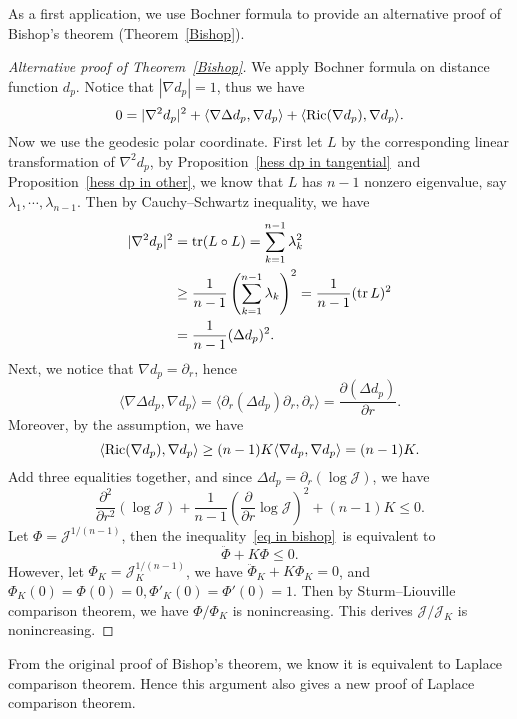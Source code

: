 As a first application, we use Bochner formula to provide an alternative proof of Bishop's theorem (Theorem~\ref{Bishop}).
\begin{proof}[Alternative proof of Theorem~\ref{Bishop}]
    We apply Bochner formula on distance function $d_p$.
    Notice that $|\nabla d_p|=1$, thus we have
    \[0=|\nabla^2d_p|^2+\langle\nabla\Delta d_p,\nabla d_p\rangle+\langle\operatorname{Ric}(\nabla d_p),\nabla d_p\rangle.\]
    Now we use the geodesic polar coordinate.
    First let $L$ by the corresponding linear transformation of $\nabla^2d_p$, by Proposition~\ref{hess dp in tangential}~and Proposition~\ref{hess dp in other}, we know that $L$ has $n-1$ nonzero eigenvalue, say $\lambda_1,\cdots,\lambda_{n-1}$.
    Then by Cauchy--Schwartz inequality, we have
    \begin{align*}
        |\nabla^2d_p|^2&=\operatorname{tr}(L\circ L)=\sum_{k=1}^{n-1}\lambda^2_k\\
        &\geq\frac{1}{n-1}\left(\sum_{k=1}^{n-1}\lambda_k\right)^2=\frac{1}{n-1}(\operatorname{tr} L)^2\\
        &=\frac{1}{n-1}(\Delta d_p)^2.
    \end{align*}
    Next, we notice that $\nabla d_p=\partial_r$, hence
    \[\langle\nabla\Delta d_p,\nabla d_p\rangle=\langle\partial_r(\Delta d_p)\partial_r,\partial_r\rangle=\frac{\partial(\Delta d_p)}{\partial{r}}.\]
    Moreover, by the assumption, we have
    \[\langle\operatorname{Ric}(\nabla d_p),\nabla d_p\rangle\geq(n-1)K\langle\nabla d_p,\nabla d_p\rangle=(n-1)K.\]
    Add three equalities together, and since $\Delta d_p=\partial_r(\log\mathscr{J})$, we have
    \begin{equation}
        \frac{\partial^2{}}{\partial{r^2}}(\log\mathscr{J})+\frac{1}{n-1}\left(\frac{\partial{}}{\partial{r}}\log\mathscr{J}\right)^2+(n-1)K\leq 0.\label{eq in bishop}
    \end{equation}
    Let $\Phi=\mathscr{J}^{1/(n-1)}$, then the inequality~\eqref{eq in bishop}~is equivalent to
    \[\ddot{\Phi}+K\Phi\leq 0.\]
    However, let $\Phi_K=\mathscr{J}_K^{1/(n-1)}$, we have $\ddot{\Phi}_K+K\Phi_K=0$, and $\Phi_K(0)=\Phi(0)=0, \Phi'_K(0)=\Phi'(0)=1$.
    Then by Sturm--Liouville comparison theorem, we have $\Phi/\Phi_K$ is nonincreasing.
    This derives $\mathscr{J}/\mathscr{J}_K$ is nonincreasing.
\end{proof}

\begin{rem}
    From the original proof of Bishop's theorem, we know it is equivalent to Laplace comparison theorem.
    Hence this argument also gives a new proof of Laplace comparison theorem.
\end{rem}

